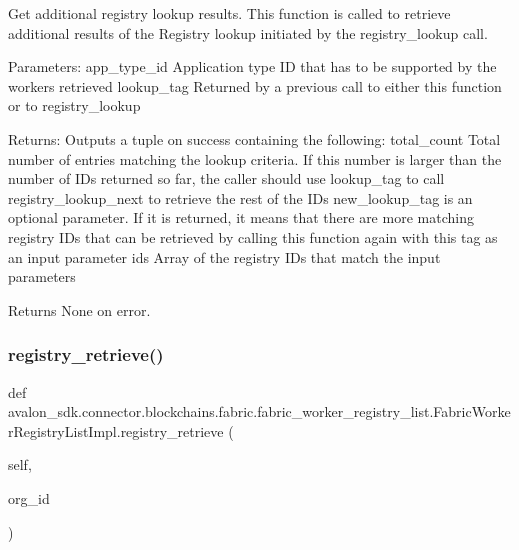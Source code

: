 \begin{DoxyVerb}Get additional registry lookup results.
This function is called to retrieve additional results of the
Registry lookup initiated by the registry_lookup call.

Parameters:
app_type_id    Application type ID that has to be
       supported by the workers retrieved
lookup_tag     Returned by a previous call to either this function
       or to registry_lookup

Returns:
Outputs a tuple on success containing the following:
total_count    Total number of entries matching the lookup
       criteria. If this number is larger than the number
       of IDs returned so far, the caller should use
       lookup_tag to call registry_lookup_next to
       retrieve the rest of the IDs
new_lookup_tag is an optional parameter. If it is returned, it means
       that there are more matching registry IDs that can be
       retrieved by calling this function again with this tag
       as an input parameter
ids            Array of the registry IDs that match the input
       parameters

Returns None on error.
\end{DoxyVerb}
 \mbox{\label{classavalon__sdk_1_1connector_1_1blockchains_1_1fabric_1_1fabric__worker__registry__list_1_1FabricWorkerRegistryListImpl_af289a41194089f586f042d69239b7a26}} 
\subsubsection{\texorpdfstring{registry\+\_\+retrieve()}{registry\_retrieve()}}
{\footnotesize\ttfamily def avalon\+\_\+sdk.\+connector.\+blockchains.\+fabric.\+fabric\+\_\+worker\+\_\+registry\+\_\+list.\+Fabric\+Worker\+Registry\+List\+Impl.\+registry\+\_\+retrieve (\begin{DoxyParamCaption}\item[{}]{self,  }\item[{}]{org\+\_\+id }\end{DoxyParamCaption})}

